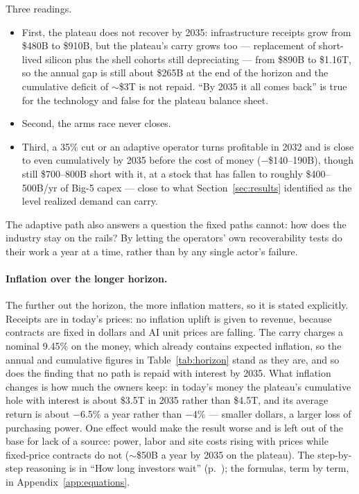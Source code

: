\documentclass[11pt,letterpaper]{article}
\begin{document}
Three readings.
\begin{itemize}
\item First, the plateau does not recover by 2035: infrastructure receipts grow from \$480B to \$910B, but the plateau's carry grows too --- replacement of short-lived silicon plus the shell cohorts still depreciating --- from \$890B to \$1.16T, so the annual gap is still about \$265B at the end of the horizon and the cumulative deficit of $\sim$\$3T is not repaid. ``By 2035 it all comes back'' is true for the technology and false for the plateau balance sheet.
\item Second, the arms race never closes.
\item Third, a 35\% cut or an adaptive operator turns profitable in 2032 and is close to even cumulatively by 2035 before the cost of money ($-$\$140--190B), though still \$700--800B short with it, at a stock that has fallen to roughly \$400--500B/yr of Big-5 capex --- close to what Section~\ref{sec:results} identified as the level realized demand can carry.
\end{itemize}

The adaptive path also answers a question the fixed paths cannot: how does the industry stay on the rails? By letting the operators' own recoverability tests do their work a year at a time, rather than by any single actor's failure.

\paragraph{Inflation over the longer horizon.} The further out the horizon, the more inflation matters, so it is stated explicitly. Receipts are in today's prices: no inflation uplift is given to revenue, because contracts are fixed in dollars and AI unit prices are falling. The carry charges a nominal 9.45\% on the money, which already contains expected inflation, so the annual and cumulative figures in Table~\ref{tab:horizon} stand as they are, and so does the finding that no path is repaid with interest by 2035. What inflation changes is how much the owners keep: in today's money the plateau's cumulative hole with interest is about \$3.5T in 2035 rather than \$4.5T, and its average return is about $-$6.5\% a year rather than $-$4\% --- smaller dollars, a larger loss of purchasing power. One effect would make the result worse and is left out of the base for lack of a source: power, labor and site costs rising with prices while fixed-price contracts do not ($\sim$\$50B a year by 2035 on the plateau). The step-by-step reasoning is in ``How long investors wait'' (p.~\pageref{ag:cum}); the formulas, term by term, in Appendix~\ref{app:equations}.
\end{document}
